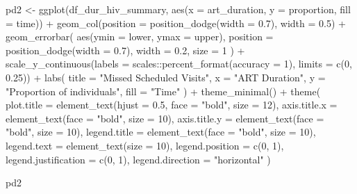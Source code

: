 \documentclass[
  letterpaper,
  DIV=11,
  numbers=noendperiod]{scrartcl}
\newenvironment{Shaded}{\begin{snugshade}}{\end{snugshade}}
\newcommand{\AttributeTok}[1]{\textcolor[rgb]{0.40,0.45,0.13}{#1}}
\newcommand{\DecValTok}[1]{\textcolor[rgb]{0.68,0.00,0.00}{#1}}
\newcommand{\FloatTok}[1]{\textcolor[rgb]{0.68,0.00,0.00}{#1}}
\newcommand{\FunctionTok}[1]{\textcolor[rgb]{0.28,0.35,0.67}{#1}}
\newcommand{\NormalTok}[1]{\textcolor[rgb]{0.00,0.23,0.31}{#1}}
\newcommand{\OtherTok}[1]{\textcolor[rgb]{0.00,0.23,0.31}{#1}}
\newcommand{\SpecialCharTok}[1]{\textcolor[rgb]{0.37,0.37,0.37}{#1}}
\newcommand{\StringTok}[1]{\textcolor[rgb]{0.13,0.47,0.30}{#1}}
\begin{document}
\begin{Shaded}
\begin{Highlighting}[]
\NormalTok{pd2 }\OtherTok{\textless{}{-}} \FunctionTok{ggplot}\NormalTok{(df\_dur\_hiv\_summary, }\FunctionTok{aes}\NormalTok{(}\AttributeTok{x =}\NormalTok{ art\_duration, }\AttributeTok{y =}\NormalTok{ proportion, }\AttributeTok{fill =}\NormalTok{ time)) }\SpecialCharTok{+}
  \FunctionTok{geom\_col}\NormalTok{(}\AttributeTok{position =} \FunctionTok{position\_dodge}\NormalTok{(}\AttributeTok{width =} \FloatTok{0.7}\NormalTok{), }\AttributeTok{width =} \FloatTok{0.5}\NormalTok{) }\SpecialCharTok{+}
  \FunctionTok{geom\_errorbar}\NormalTok{(}
    \FunctionTok{aes}\NormalTok{(}\AttributeTok{ymin =}\NormalTok{ lower, }\AttributeTok{ymax =}\NormalTok{ upper),}
    \AttributeTok{position =} \FunctionTok{position\_dodge}\NormalTok{(}\AttributeTok{width =} \FloatTok{0.7}\NormalTok{),}
    \AttributeTok{width =} \FloatTok{0.2}\NormalTok{,}
    \AttributeTok{size =} \DecValTok{1}
\NormalTok{  ) }\SpecialCharTok{+}
  \FunctionTok{scale\_y\_continuous}\NormalTok{(}\AttributeTok{labels =}\NormalTok{ scales}\SpecialCharTok{::}\FunctionTok{percent\_format}\NormalTok{(}\AttributeTok{accuracy =} \DecValTok{1}\NormalTok{), }\AttributeTok{limits =} \FunctionTok{c}\NormalTok{(}\DecValTok{0}\NormalTok{, }\FloatTok{0.25}\NormalTok{)) }\SpecialCharTok{+}
  \FunctionTok{labs}\NormalTok{(}
    \AttributeTok{title =} \StringTok{"Missed Scheduled Visits"}\NormalTok{,}
    \AttributeTok{x =} \StringTok{"ART Duration"}\NormalTok{,}
    \AttributeTok{y =} \StringTok{"Proportion of individuals"}\NormalTok{,}
    \AttributeTok{fill =} \StringTok{"Time"}
\NormalTok{  ) }\SpecialCharTok{+}
  \FunctionTok{theme\_minimal}\NormalTok{() }\SpecialCharTok{+}
  \FunctionTok{theme}\NormalTok{(}
    \AttributeTok{plot.title =} \FunctionTok{element\_text}\NormalTok{(}\AttributeTok{hjust =} \FloatTok{0.5}\NormalTok{, }\AttributeTok{face =} \StringTok{"bold"}\NormalTok{, }\AttributeTok{size =} \DecValTok{12}\NormalTok{),}
    \AttributeTok{axis.title.x =} \FunctionTok{element\_text}\NormalTok{(}\AttributeTok{face =} \StringTok{"bold"}\NormalTok{, }\AttributeTok{size =} \DecValTok{10}\NormalTok{),}
    \AttributeTok{axis.title.y =} \FunctionTok{element\_text}\NormalTok{(}\AttributeTok{face =} \StringTok{"bold"}\NormalTok{, }\AttributeTok{size =} \DecValTok{10}\NormalTok{),}
    \AttributeTok{legend.title =} \FunctionTok{element\_text}\NormalTok{(}\AttributeTok{face =} \StringTok{"bold"}\NormalTok{, }\AttributeTok{size =} \DecValTok{10}\NormalTok{),}
    \AttributeTok{legend.text =} \FunctionTok{element\_text}\NormalTok{(}\AttributeTok{size =} \DecValTok{10}\NormalTok{),}
    \AttributeTok{legend.position =} \FunctionTok{c}\NormalTok{(}\DecValTok{0}\NormalTok{, }\DecValTok{1}\NormalTok{), }
    \AttributeTok{legend.justification =} \FunctionTok{c}\NormalTok{(}\DecValTok{0}\NormalTok{, }\DecValTok{1}\NormalTok{),}
    \AttributeTok{legend.direction =} \StringTok{"horizontal"}
\NormalTok{  )}

\NormalTok{pd2}
\end{Highlighting}
\end{Shaded}
\end{document}
